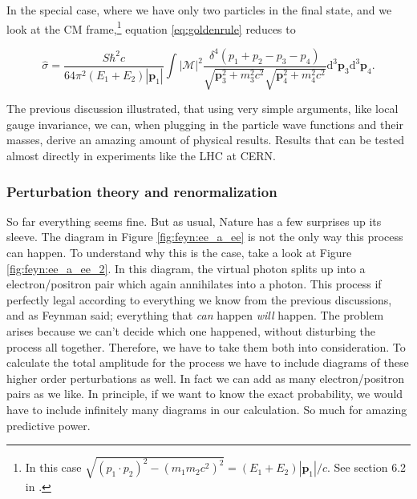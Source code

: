 In the special case, where we have only two particles in the final state, and we look at the CM frame,\footnote{In this case $\sqrt{(p_1\cdot p_2)^2 - (m_1m_2 c^2)^2} = (E_1+E_2)|\mathbf{p}_1|/c$. See section 6.2 in \cite{griffiths1987iep}.} equation \eqref{eq:goldenrule} reduces to \cite{griffiths1987iep}

\begin{equation}
	\hat \sigma = \frac{S\hbar^2c}{64\pi^2(E_1+E_2)|\mathbf{p}_1|} \int | \mathcal{M} |^2
	\frac{\delta^4(p_1+p_2-p_3-p_4)}{\sqrt{\mathbf{p}_3^2+m_3^2c^2}\sqrt{\mathbf{p}_4^2+m_4^2c^2}} \textrm{d}^3\mathbf{p}_3\textrm{d}^3\mathbf{p}_4.
\end{equation}

The previous discussion illustrated, that using very simple arguments, like local gauge invariance, we can, when plugging in the particle wave functions and their masses, derive an amazing amount of physical results. Results that can be tested almost directly in experiments like the LHC at CERN.

\subsubsection{Perturbation theory and renormalization}
So far everything seems fine. But as usual, Nature has a few surprises up its sleeve. The diagram in Figure \ref{fig:feyn:ee_a_ee} is not the only way this process can happen. To understand why this is the case, take a look at Figure \ref{fig:feyn:ee_a_ee_2}. In this diagram, the virtual photon splits up into a electron/positron pair which again annihilates into a photon. This process if perfectly legal according to everything we know from the previous discussions, and as Feynman said; everything that \emph{can} happen \emph{will} happen. The problem arises because we can't decide which one happened, without disturbing the process all together. Therefore,  we have to take them both into consideration. To calculate the total amplitude for the process we have to include diagrams of these higher order perturbations as well. In fact we can add as many electron/positron pairs as we like. In principle, if we want to know the exact probability, we would have to include infinitely many diagrams in our calculation. So much for amazing predictive power.

